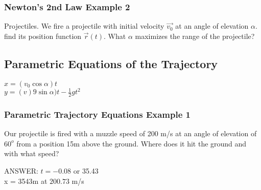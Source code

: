 \documentclass[12pt]{article}
\begin{document}
\subsubsection{Newton's 2nd Law Example 2}
Projectiles. We fire a projectile with initial velocity \(\vec{v_0}  \) at an angle of elevation \(\alpha\). find its position function \(\vec{r} (t) \). What \(\alpha\) maximizes the range of the projectile?    


\subsection{Parametric Equations of the Trajectory}

\(x=(v_0\cos\alpha)t\) \\%
\(y=(v)9\sin\alpha)t - \frac{1}{2}gt^2\) 

\subsubsection{Parametric Trajectory Equations Example 1}
Our projectile is fired with a muzzle speed of 200 m/s at an angle of elevation of \(60^o\) from a position 15m above the ground.
Where does it hit the ground and with what speed?

ANSWER: \(t=-0.08\) or 35.43\\%
x = 3543m at \(200.73\) m/s
\end{document}
